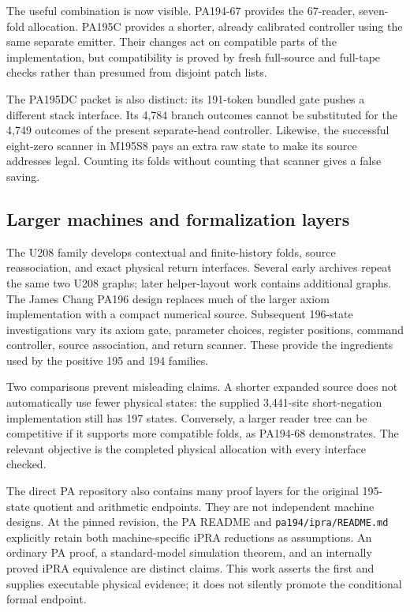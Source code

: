 \documentclass[11pt,letterpaper]{article}
\newcommand{\file}[1]{\texttt{\nolinkurl{#1}}}
\begin{document}
The useful combination is now visible. PA194-67 provides the 67-reader,
seven-fold allocation. PA195C provides a shorter, already calibrated
controller using the same separate emitter. Their changes act on compatible
parts of the implementation, but compatibility is proved by fresh
full-source and full-tape checks rather than presumed from disjoint
patch lists.

The PA195DC packet is also distinct: its 191-token bundled gate pushes a
different stack interface. Its 4,784 branch outcomes cannot be substituted
for the 4,749 outcomes of the present separate-head controller. Likewise,
the successful eight-zero scanner in M195S8 pays an extra raw state to
make its source addresses legal. Counting its folds without counting that
scanner gives a false saving.

\subsection{Larger machines and formalization layers}

The U208 family develops contextual and finite-history folds, source
reassociation, and exact physical return interfaces. Several early
archives repeat the same two U208 graphs; later helper-layout work contains
additional graphs. The James Chang PA196 design replaces much of the
larger axiom implementation with a compact numerical source. Subsequent
196-state investigations vary its axiom gate, parameter choices,
register positions, command controller, source association, and return
scanner. These provide the ingredients used by the positive 195 and
194 families.

Two comparisons prevent misleading claims. A shorter expanded source
does not automatically use fewer physical states: the supplied 3,441-site
short-negation implementation still has 197 states. Conversely, a larger
reader tree can be competitive if it supports more compatible folds, as
PA194-68 demonstrates. The relevant objective is the completed physical
allocation with every interface checked.

The direct PA repository also contains many proof layers for the original
195-state quotient and arithmetic endpoints. They are not independent
machine designs. At the pinned revision, the PA README and
\file{pa194/ipra/README.md} explicitly retain both machine-specific
iPRA reductions as assumptions. An ordinary PA proof, a standard-model
simulation theorem, and an internally proved iPRA equivalence are distinct
claims. This work asserts the first and supplies executable physical
evidence; it does not silently promote the conditional formal endpoint.
\end{document}
